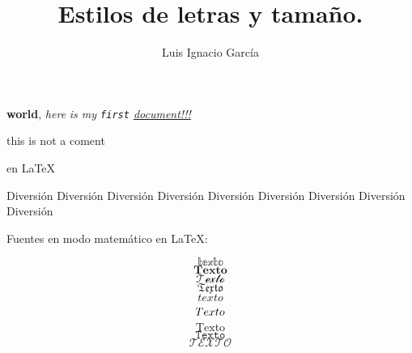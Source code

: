 \documentclass{article}
\begin{document}
\title{Estilos de letras y tama\~no.}


\author{Luis Ignacio  Garc\'ia}
\maketitle
\newline\newline %
\begin{centering}

\textbf{world},\newline %
\textit{here}\newline %
\em{ is my}\newline %
\newline  %
\texttt{first}\newline %
\underline{ document!!!}\newline %
\end{centering}
\newline
this is not a coment\newpage

 en \LaTeX \newline\newline
\begin{centering}

\tiny{Diversi\'on}\newline
\scriptsize{Diversi\'on}\newline
\footnotesize{Diversi\'on}\newline
\small{Diversi\'on}\newline
\normalsize{Diversi\'on}\newline
\large{Diversi\'on}\newline
\Large{Diversi\'on}\newline
\huge{Diversi\'on}\newline
\Huge{Diversi\'on}\newline
\end{centering}
\newpage
Fuentes en modo matem\'atico en \LaTeX:

$$\mathbb{texto}$$
$$\mathbf{Texto}$$
$$\mathcal{Texto}$$
$$\mathfrak{Texto}$$
$$\mathit{texto}$$
$$\mathnormal{Texto}$$
$$\mathrm{Texto}$$
$$\mathtt{Texto}$$
$$\mathscr{TEXTO}$$
\end{document}
